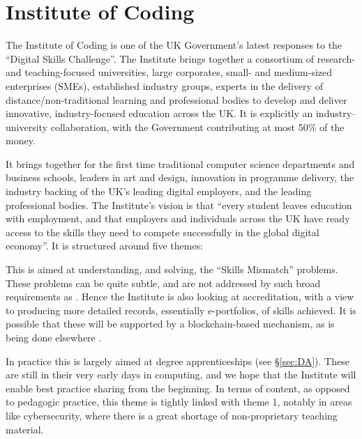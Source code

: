 \documentclass[sigconf]{acmart}
\begin{document}
\section{Institute of Coding}\label{ioc}

The Institute of Coding is one of the UK Government's
latest responses to the ``Digital Skills Challenge''. The Institute
brings together a consortium of research- and teaching-focused
universities, large corporates, small- and medium-sized enterprises
(SMEs), established industry groups, experts in the delivery of
distance/non-traditional learning and professional bodies to develop
and deliver innovative, industry-focused education across the UK. It
is explicitly an industry--university collaboration, with the
Government contributing at most 50\% of the money.

It brings together for the first time traditional computer science
departments and business schools, leaders in art and design,
innovation in programme delivery, the industry backing of the UK's
leading digital employers, and the leading professional bodies.  The
Institute's vision is that ``every student leaves education with
employment, and that employers and individuals across the UK have
ready access to the skills they need to compete successfully in the
global digital economy''. It is structured around five themes:\newline

 This is aimed at
understanding, and solving, the ``Skills Mismatch'' problems. These
problems can be quite subtle, and are not addressed by such broad
requirements as \cite[Requirement 2.3.1]{BCS2018a}.  Hence the
Institute is also looking at accreditation, with a view to producing
more detailed records, essentially e-portfolios, of skills
achieved. It is possible that these will be supported by a
blockchain-based mechanism, as is being done elsewhere
\cite{RMIT2018a}. \newline

 In practice this is largely aimed at
degree apprenticeships (see \S\ref{sec:DA}). These are still in their
very early days in computing, and we hope that the Institute will
enable best practice sharing from the beginning. In terms of content,
as opposed to pedagogic practice, this theme is tightly linked with
theme 1, notably in areas like cybersecurity, where there is a great
shortage of non-proprietary teaching material.\newline
\end{document}
